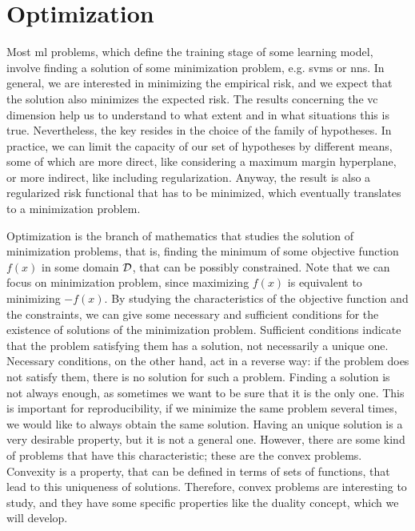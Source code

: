 \section{Optimization}
%
Most \acrshort{ml} problems, which define the training stage of some learning model, involve finding a solution of some minimization problem, e.g. \acrshort{svms} or \acrshort{nns}.
%
In general, we are interested in minimizing the empirical risk, and we expect that the solution also minimizes the expected risk. The results concerning the \acrshort{vc} dimension help us to understand to what extent and in what situations this is true. Nevertheless, the key resides in the choice of the family of hypotheses.
%
In practice, we can limit the capacity of our set of hypotheses by different means, some of which are more direct, like considering a maximum margin hyperplane, or more indirect, like including regularization. Anyway, the result is also a regularized risk functional that has to be minimized, which eventually translates to a minimization problem.

%
Optimization is the branch of mathematics that studies the solution of minimization problems, that is, finding the minimum of some objective function $f(x)$ in some domain $\mathcal{D}$, that can be possibly constrained. Note that we can focus on minimization problem, since maximizing $f(x)$ is equivalent to minimizing $-f(x)$.
%
By studying the characteristics of the objective function and the constraints, we can give some necessary and sufficient conditions for the existence of solutions of the minimization problem. Sufficient conditions indicate that the problem satisfying them has a solution, not necessarily a unique one. Necessary conditions, on the other hand, act in a reverse way: if the problem does not satisfy them, there is no solution for such a problem.
% 
Finding a solution is not always enough, as sometimes we want to be sure that it is the only one. This is important for reproducibility, if we minimize the same problem several times, we would like to always obtain the same solution.
%
Having an unique solution is a very desirable property, but it is not a general one. However, there are some kind of problems that have this characteristic; these are the convex problems. Convexity is a property, that can be defined in terms of sets of functions, that lead to this uniqueness of solutions.
%
Therefore, convex problems are interesting to study, and they have some specific properties like the duality concept, which we will develop.

%

